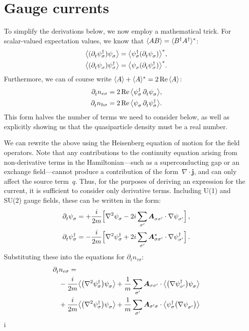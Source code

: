 \clearpage
\section{Gauge currents}
To simplify the derivations below, we now employ a mathematical trick.
For scalar-valued expectation values, we know that $\langle AB \rangle = \langle B^\dagger A^\dagger \rangle^*$:
\begin{align}
  \avg[\big]{(\p{t}  \hc{\psi_\sigma}) \pc{\psi_\sigma}} &= \cc{\avg[\big]{\hc{\psi_\sigma} (\p{t} \pc{\psi_\sigma}) }}, \\
  \avg[\big]{(\p{t}  \pc{\psi_\sigma}) \hc{\psi_\sigma}} &= \cc{\avg[\big]{\pc{\psi_\sigma} (\p{t} \hc{\psi_\sigma}) }}.
\end{align}
Furthermore, we can of course write $\langle A \rangle+\langle A \rangle^{\ast} = 2\operatorname{Re}{\langle A \rangle}$:
\begin{align}
  \p t n_{e\sigma} &= 2 \re
  \avg[\big]{\hc{\psi_{\sigma}}\, \p t \pc{\psi_{\sigma}}} , \\
  \p t n_{h\sigma} &= 2 \re
  \avg[\big]{\pc{\psi_{\sigma}}\, \p t \hc{\psi_{\sigma}}} .
\end{align}
This form halves the number of terms we need to consider below, as well as explicitly showing us that the quasiparticle density must be a real number.

We can rewrite the above using the Heisenberg equation of motion for the field operators.
Note that any contributions to the continuity equation arising from non-derivative terms in the Hamiltonian---such as a superconducting gap or an exchange field---cannot produce a contribution of the form~$\nabla\cdot\bm{j}$, and can only affect the source term~$q$.
Thus, for the purposes of deriving an expression for the current, it is sufficient to consider only derivative terms.
Including U(1) and SU(2) gauge fields, these can be written in the form:
\begin{align}
  \p t \pc{\psi_\sigma} &= +\frac{i}{2m} \Big[ \nabla^2\pc{\psi_\sigma} - 2i\sum_{\sigma'} \pc{\bm{A}_{\sigma\sigma'}} \cdot \nabla \pc{\psi_{\sigma'}} \Big]\,, \\
  \p t \hc{\psi_\sigma} &= -\frac{i}{2m} \Big[ \nabla^2\hc{\psi_\sigma} + 2i\sum_{\sigma'} \cc{\bm{A}_{\sigma\sigma'}} \cdot \nabla \hc{\psi_{\sigma'}} \Big]\,.
\end{align}
Substituting these into the equations for $\partial_t n_{\tau\sigma}$:
\begin{align}
  \p t & n_{e\sigma} = \\
       &- \frac{i}{2m} \avg[\big]{\big(\nabla^2\hc{\psi_\sigma}\big) \pc{\psi_\sigma}}
        + \frac{1}{m}  \sum_{\sigma'} \bm{A}_{\sigma\sigma'} \cdot \avg[\big]{\big(\nabla\hc{\psi_{\sigma'}}\big) \pc{\psi_{\sigma}}} \\
       &+ \frac{i}{2m} \avg[\big]{\big(\nabla^2\hc{\psi_\sigma}\big) \pc{\psi_\sigma}}
        + \frac{1}{m}  \sum_{\sigma'} \bm{A}_{\sigma'\sigma} \cdot \avg[\big]{\hc{\psi_\sigma} \big(\nabla\pc{\psi_{\sigma'}}\big)} \\
\end{align}
           i
